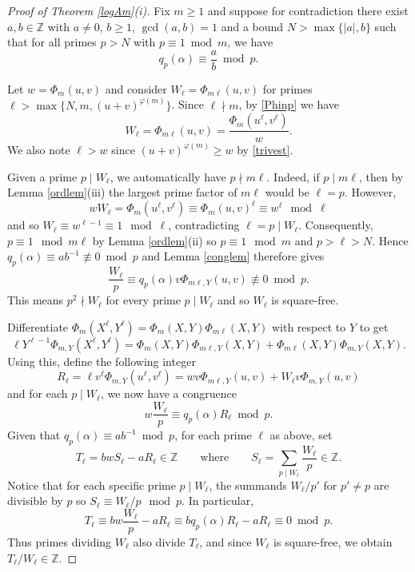 \documentclass[10pt,a4paper]{amsart}
\begin{document}
\begin{proof}[Proof of Theorem \ref{logAm}(i)] 
Fix $m\geq 1$ and suppose for contradiction there exist $a, b\in\mathbb{Z}$ with $a\neq 0$, $b\geq 1$, $\gcd(a,b)=1$ and a bound $N>\max\{|a|,b\}$ such that for all primes $p>N$ with $p\equiv 1\bmod m$,  we have
\[q_p(\alpha)\equiv \frac{a}{b}\bmod p.\] 
\vspace{-0.1cm}

\noindent
Let $w=\Phi_m(u,v)$ and consider $W_\ell=\Phi_{m\ell}(u,v)$ for primes $\ell>\max\{N, m, (u+v)^{\varphi(m)}\}$. 
Since $\ell\nmid m$, by \eqref{Phinp} we have  
\[W_\ell=\Phi_{m\ell}(u,v)=\frac{\Phi_m(u^\ell,v^\ell)}{w}.\]
We also note $\ell>w$ since $(u+v)^{\varphi(m)}\geq w$ by \eqref{trivest}.
\vspace{0.2cm}

Given a prime $p\mid W_\ell$, we automatically have $p\nmid m\ell$. Indeed, if $p\mid m\ell$, then by Lemma \ref{ordlem}(iii) the largest prime factor of $m\ell$ would be $\ell=p$. However, 
\[wW_\ell=\Phi_m(u^\ell,v^\ell)\equiv\Phi_m(u,v)^\ell\equiv w^\ell\mod\ell\]
and so $W_\ell\equiv w^{\ell-1}\equiv 1\mod\ell$, contradicting $\ell=p\mid W_\ell$. 
Consequently, $p\equiv 1\mod m\ell$ by Lemma \ref{ordlem}(ii) so $p\equiv 1\mod m$ and $p>\ell>N$.
Hence $q_p(\alpha)\equiv ab^{-1}\not\equiv 0\bmod p$ and Lemma \ref{conglem} therefore gives
\begin{equation*}\label{Wlcong}
\frac{W_\ell}{p}\equiv q_p(\alpha)v\Phi_{m\ell,Y}(u,v)\not\equiv 0\bmod p.
\end{equation*}
This means $p^2\nmid W_\ell$ for every prime $p\mid W_\ell$ and so $W_\ell$ is square-free.
\bigskip

Differentiate $\Phi_m(X^\ell,Y^\ell)=\Phi_m(X,Y)\Phi_{m\ell}(X,Y)$ with respect to $Y$ to get
\[\ell Y^{\ell-1}\Phi_{m,Y}(X^\ell,Y^\ell)=\Phi_m(X,Y)\Phi_{m\ell,Y}(X,Y)+\Phi_{m\ell}(X,Y)\Phi_{m,Y}(X,Y).\]
Using this, define the following integer
\[R_\ell=\ell v^\ell\Phi_{m,Y}(u^\ell,v^\ell)=wv\Phi_{m\ell,Y}(u,v)+W_\ell v\Phi_{m,Y}(u,v)\]
and for each $p\mid W_\ell$, we now have a congruence
\begin{equation*}\label{wWlcong}
w\frac{W_\ell}{p}\equiv q_p(\alpha)R_\ell\bmod p.
\end{equation*}
Given that $q_p(\alpha)\equiv ab^{-1}\bmod p$, for each prime $\ell$ as above, set
\begin{equation}\label{Tell}
T_\ell=bwS_\ell-aR_\ell\in\mathbb{Z}\qquad\text{where}\qquad S_\ell=\sum_{p\mid W_\ell}\frac{W_\ell}{p}\in\mathbb{Z}.
\end{equation}
Notice that for each specific prime $p\mid W_\ell$, the summands $W_\ell/p'$ for $p'\neq p$ are divisible by $p$ so
$S_\ell\equiv W_\ell/p\mod p$. In particular, 
\[T_\ell\equiv bw\frac{W_\ell}{p}-aR_\ell\equiv bq_p(\alpha)R_\ell-aR_\ell\equiv 0\bmod p.\]
Thus primes dividing $W_\ell$ also divide $T_\ell$, and since $W_\ell$ is square-free, we obtain $T_\ell/W_\ell\in\mathbb{Z}$.
\bigskip


\end{proof}
\end{document}
